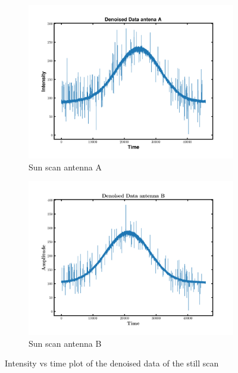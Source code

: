 \documentclass[12pt]{article}
\begin{document}
 \begin{figure}[H]
     \centering
     \begin{subfigure}{.45\textwidth}
         \centering
         \includegraphics[width=\textwidth]{fig/still_Denoised_Data_antena_A.png}
         \caption{Sun scan antenna A}
         \label{fig2.11}
     \end{subfigure}
     \hfill
     \begin{subfigure}{.45\textwidth}
         \centering
         \includegraphics[width=\textwidth]{fig/still_Denoised_Data_antena_B.png}
         \caption{Sun scan antenna B}
         \label{fig2.12}
     \end{subfigure}
        \caption{Intensity vs time plot of the denoised data of the still scan}
        \label{fig2.1112}
 \end{figure}
\end{document}
